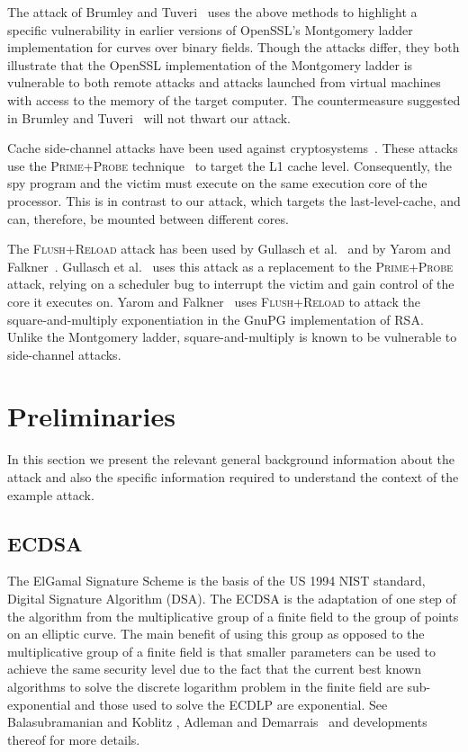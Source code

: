 \documentclass[twocolumn]{svjour3}
\newcommand{\fl}{\textsc{Flu\-sh+\allowbreak Re\-load}\xspace}
\newcommand{\prpr}{\textsc{Prime+\allowbreak Probe}\xspace}
\newcommand{\myupcase}[1]{\uppercase{#1}}
\begin{document}
The attack of Brumley and Tuveri~\cite{brumley11remote} uses the above methods to highlight a specific vulnerability 
in earlier versions of OpenSSL's Montgomery ladder implementation for curves over binary fields.
Though the attacks differ, they both illustrate that the OpenSSL implementation of the Montgomery ladder is vulnerable to  both remote attacks and attacks launched from virtual machines with access to the memory of the target computer. 
The countermeasure suggested in Brumley and Tuveri~\cite{brumley11remote} will not thwart our attack.

Cache side-channel attacks have been used against cryptosystems~\cite{aciicmez07yet,aciicmez10new,aciicmez08vulnerability,chen13improvement,canteaut06understanding,tromer10efficient,zhang12cross}.
These attacks use the \prpr technique~\cite{tromer10efficient} to target the L1 cache level.
Consequently, the spy program and the victim must execute on the same execution core of the processor.
This is in contrast to our attack, which targets the last-level-cache, and can, therefore, be mounted between different cores.

The \fl attack has been used by Gullasch et al.~\cite{gullasch11cache} and by Yarom and Falkner~\cite{yarom13flush}.
Gullasch et al.~\cite{gullasch11cache} uses this attack as a replacement to the \prpr attack,
relying on a scheduler bug to interrupt the victim and gain control of the core it executes on.
Yarom and Falkner~\cite{yarom13flush} uses \fl to attack the square-and-multiply exponentiation
in the GnuPG implementation of RSA.
Unlike the Montgomery ladder, square-and-multiply is known to be vulnerable to side-channel attacks.

\section{Preliminaries}\label{sec:background}
In this section we present the relevant general background information about the attack and also the specific information required to understand the context of the example attack. %

\subsection{ECDSA}\label{sub:ecdsa}

The ElGamal Signature Scheme \cite{Elgamal85} is the basis of the US 1994 NIST standard, Digital Signature Algorithm (\myupcase{dsa}). The \myupcase{ecdsa} is the adaptation of one step of the algorithm from the multiplicative group of a finite field to the group of points on an elliptic curve. The main benefit of using this group as opposed to the multiplicative group of a finite field is that smaller parameters can be used to achieve the same security level \cite{koblitz87elliptic,miller85use} due to the fact that the current best known algorithms to solve the discrete logarithm problem in the finite field are sub-exponential and those used to solve the \myupcase{ecdlp} are exponential.
See Balasubramanian and Kob\-litz \cite{balasubramanian-koblitz}, Adleman and Demarrais~\cite{adelman-demarrais} and developments thereof for more details. 
\end{document}
